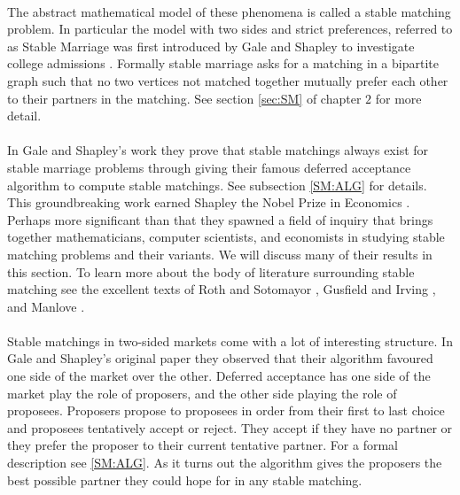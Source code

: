 \paragraph{}
The abstract mathematical model of these phenomena is called a stable matching problem. In particular the model with two sides and strict preferences, referred to as Stable Marriage was first introduced by Gale and Shapley to investigate college admissions \cite{gale1962college}. Formally stable marriage asks for a matching in a bipartite graph such that no two vertices not matched together mutually prefer each other to their partners in the matching. See section \ref{sec:SM} of chapter $2$ for more detail. 

\paragraph{}
In Gale and Shapley's work they prove that stable matchings always exist for stable marriage problems through giving their famous deferred acceptance algorithm to compute stable matchings. See subsection \ref{SM:ALG} for details. This groundbreaking work earned Shapley the Nobel Prize in Economics \cite{economic2012stable}. Perhaps more significant than that they spawned a field of inquiry that brings together mathematicians, computer scientists, and economists in studying stable matching problems and their variants. We will discuss many of their results in this section. To learn more about the body of literature surrounding stable matching see the excellent texts of Roth and Sotomayor \cite{roth1992two}, Gusfield and Irving \cite{gusfield1989stable}, and Manlove \cite{manlove2013algorithmics}.
\paragraph{}
Stable matchings in two-sided markets come with a lot of interesting structure. In Gale and Shapley's original paper \cite{gale1962college} they observed that their algorithm favoured one side of the market over the other. Deferred acceptance has one side of the market play the role of proposers, and the other side playing the role of proposees. Proposers propose to proposees in order from their first to last choice and proposees tentatively accept or reject. They accept if they have no partner or they prefer the proposer to their current tentative partner. For a formal description see \ref{SM:ALG}. As it turns out the algorithm gives the proposers the best possible partner they could hope for in any stable matching. 
